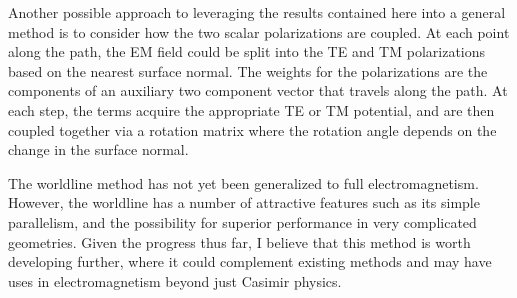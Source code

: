 Another possible approach to leveraging the results contained here into a general method is to consider 
how the two scalar polarizations are coupled.  
At each point along the path, the EM field could be split into the TE and TM polarizations based 
on the nearest surface normal.
The weights for the polarizations are the components of an auxiliary two component vector that travels along the path.
At each step, the terms acquire the appropriate TE or TM potential, 
and are then coupled together via a rotation matrix where the rotation
angle depends on the change in the surface normal.  

The worldline method has not yet been generalized to full electromagnetism.   
However, the worldline has a number of attractive features such as its simple parallelism, and the possibility
for superior performance in very complicated geometries.  Given the progress thus far,  
I believe that this method is worth developing further, where it could complement existing methods
and may have uses in electromagnetism beyond just Casimir physics.




